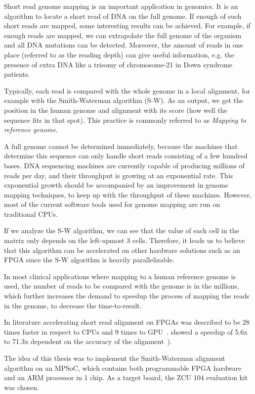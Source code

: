Short read genome mapping is an important application in genomics. It is an algorithm to locate a short read of DNA on the full genome. If enough of such short reads are mapped, some interesting results can be achieved. For example, if enough reads are mapped, we can extrapolate the full genome of the organism and all DNA mutations can be detected. Moreover, the amount of reads in one place (referred to as the reading depth) can give useful information, e.g. the presence of extra DNA like a trisomy of chromosome-21 in Down syndrome patients.

Typically, each read is compared with the whole genome in a local alignment, for example with the Smith-Waterman algorithm (S-W). As an output, we get the position in the human genome and alignment with its score (how well the sequence fits in that spot). This practice is commonly referred to as \emph{Mapping to reference genome}.

A full genome cannot be determined immediately, because the machines that determine this sequence can only handle short reads consisting of a few hundred bases. DNA sequencing machines are currently capable of producing millions of reads per day, and their throughput is growing at an exponential rate. This exponential growth should be accompanied by an improvement in genome mapping techniques, to keep up with the throughput of these machines. However, most of the current software tools used for genome mapping are run on traditional CPUs. 

If we analyze the S-W algorithm, we can see that the value of each cell in the matrix only depends on the left-upmost 3 cells. Therefore, it leads us to believe that this algorithm can be accelerated on other hardware solutions such as an FPGA since the S-W algorithm is heavily parallelizable.

In most clinical applications where mapping to a human reference genome is used, the number of reads to be compared with the genome is in the millions, which further increases the demand to speedup the process of mapping the reads in the genome, to decrease the time-to-result.

In literature accelerating short read alignment on FPGAs was described to be 28 times faster in respect to CPUs and 9 times to GPU~\cite{FPGAacc}. showed a speedup of 5.6x to 71.3x dependent on the accuracy of the alignment~\cite{FPGAacc2}).

The idea of this thesis was to implement the Smith-Waterman alignment algorithm on an MPSoC, which contains both programmable FPGA hardware and an ARM processor in 1 chip. As a target board, the ZCU 104 evaluation kit was chosen.

